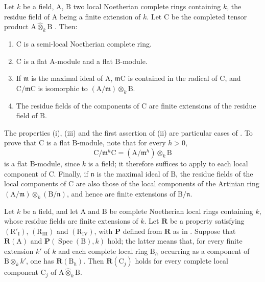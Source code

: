 \begin{lemma}[7.5.5]
\label{IV.7.5.5}
Let $k$ be a field, $\mathrm{A}$, $\mathrm{B}$ two local Noetherian complete rings containing $k$, the residue field of $\mathrm{A}$ being a finite extension of $k$. Let $\mathrm{C}$ be the completed tensor product $\mathrm{A}\widehat{\otimes}_k\mathrm{B}$ . Then:
\begin{enumerate}[label=(\roman*)]
  \item $\mathrm{C}$ is a semi-local Noetherian complete ring.
  \item $\mathrm{C}$ is a flat $\mathrm{A}$-module and a flat $\mathrm{B}$-module.
  \item If $\mathfrak{m}$ is the maximal ideal of $\mathrm{A}$, $\mathfrak{m}\mathrm{C}$ is contained in the radical of $\mathrm{C}$, and $\mathrm{C}/\mathfrak{m}\mathrm{C}$ is isomorphic to $(\mathrm{A}/\mathfrak{m})\otimes_k\mathrm{B}$.
  \item The residue fields of the components of $\mathrm{C}$ are finite extensions of the residue field of $\mathrm{B}$.
\end{enumerate}
The properties (i), (iii) and the first assertion of (ii) are particular cases of . To prove that $\mathrm{C}$ is a flat $\mathrm{B}$-module, note that for every $h>0$,
\[
  \mathrm{C}/\mathfrak{m}^h\mathrm{C}
  =(\mathrm{A}/\mathfrak{m}^h)\otimes_k\mathrm{B}
\]
is a flat $\mathrm{B}$-module, since $k$ is a field; it therefore suffices to apply  to each local component of $\mathrm{C}$. Finally, if $\mathfrak{n}$ is the maximal ideal of $\mathrm{B}$, the residue fields of the local components of $\mathrm{C}$ are also those of the local components of the Artinian ring $(\mathrm{A}/\mathfrak{m})\otimes_k(\mathrm{B}/\mathfrak{n})$, and hence are finite extensions of $\mathrm{B}/\mathfrak{n}$.
\end{lemma}

\begin{proposition}[7.5.6]
\label{IV.7.5.6}
Let $k$ be a field, and let $\mathrm{A}$ and $\mathrm{B}$ be complete Noetherian local rings containing $k$, whose residue fields are finite extensions of $k$. Let $\boldsymbol{R}$ be a property satisfying $(\mathrm{R}'_{\mathrm{I}})$, $(\mathrm{R}_{\mathrm{III}})$ and $(\mathrm{R}_{\mathrm{IV}})$, with $\boldsymbol{P}$ defined from $\boldsymbol{R}$ as in . Suppose that $\boldsymbol{R}(\mathrm{A})$ and $\boldsymbol{P}(\operatorname{Spec}(\mathrm{B}),k)$ hold; the latter means that, for every finite extension $k'$ of $k$ and each complete local ring $\mathrm{B}_h$ occurring as a component of $\mathrm{B}\otimes_k k'$, one has $\boldsymbol{R}(\mathrm{B}_h)$. Then $\boldsymbol{R}(\mathrm{C}_j)$ holds for every complete local component $\mathrm{C}_j$ of $\mathrm{A}\widehat{\otimes}_k\mathrm{B}$.
\end{proposition}

